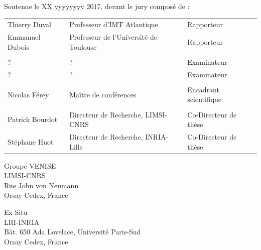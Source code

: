 \begin{titlepage}

Soutenue le XX yyyyyyyy 2017, devant le jury composé de :\\

\begin{center}
	\begin{tabular}{l l l}
	
	Thierry Duval		& Professeur d'IMT Atlantique				& Rapporteur	\\ 
	Emmanuel Dubois		& Professeur de l'Université de Toulouse	& Rapporteur	\\
						& 	&				\\ %
	?					&?		 		& Examinateur	\\ 
	?					&?				& Examinateur	\\ 
						& 	&				\\ %
	Nicolas Férey		& Maître de conférences					& Encadrant scientifique\\
						& 	&				\\ %
	Patrick Bourdot 	& Directeur de Recherche, LIMSI-CNRS	& Co-Directeur de thèse\\ 
	Stéphane Huot		& Directeur de Recherche, INRIA-Lille	& Co-Directeur de thèse\\ 
		
	\end{tabular}
\end{center}


\setlength{\columnsep}{7mm}
\setlength{\columnseprule}{0pt}

\begin{multicols}{2} 
\small 
\noindent Groupe VENISE					\\	
\noindent LIMSI-CNRS					\\
\noindent Rue John von Neumann			\\
 Orsay Cedex, France		\\	

\columnbreak

\raggedleft Ex Situ										\\
\noindent LRI-INRIA										\\
\noindent Bât. 650 Ada Lovelace, Université Paris-Sud	\\
 Orsay Cedex, France
\end{multicols}



\end{titlepage}